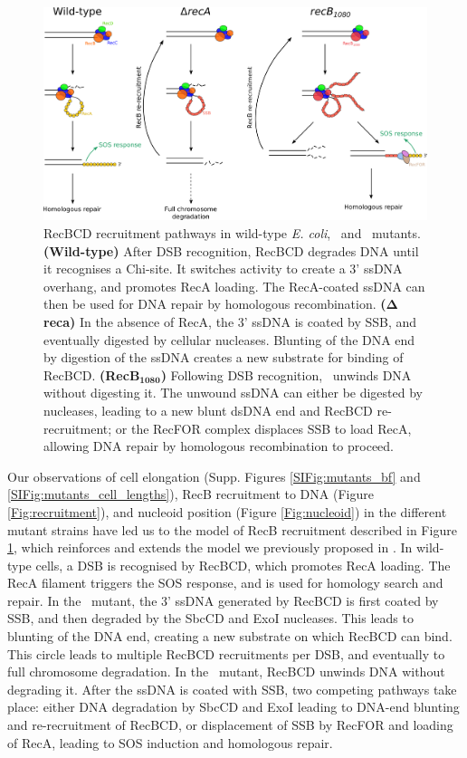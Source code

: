 \begin{figure}[htbp]
    \centering
    \includegraphics[width=\textwidth]{Figures/Fig_mutants_pathways.pdf}
    \caption{RecBCD recruitment pathways in wild-type \emph{E. coli}, \dreca\ and \geneteneighty\ mutants. \textbf{(Wild-type)} After DSB recognition, RecBCD degrades DNA until it recognises a Chi-site. It switches activity to create a 3' ssDNA overhang, and promotes RecA loading. The RecA-coated ssDNA can then be used for DNA repair by homologous recombination. \textbf{($\mathbf{\Delta}$reca)} In the absence of RecA, the 3' ssDNA is coated by SSB, and eventually digested by cellular nucleases. Blunting of the DNA end by digestion of the ssDNA creates a new substrate for binding of RecBCD. \textbf{(RecB$\mathbf{_{1080}}$)} Following DSB recognition, \teneighty\ unwinds DNA without digesting it. The unwound ssDNA can either be digested by nucleases, leading to a new blunt dsDNA end and RecBCD re-recruitment; or the RecFOR complex displaces SSB to load RecA, allowing DNA repair by homologous recombination to proceed.}
    \label{Fig:pathways}
\end{figure}

Our observations of cell elongation (Supp. Figures \ref{SIFig:mutants_bf} and \ref{SIFig:mutants_cell_lengths}), RecB recruitment to DNA (Figure \ref{Fig:recruitment}), and nucleoid position (Figure \ref{Fig:nucleoid}) in the different mutant strains have led us to the model of RecB recruitment described in Figure \ref{Fig:pathways}, which reinforces and extends the model we previously proposed in \cite{Lepore2023}. In wild-type cells, a DSB is recognised by RecBCD, which promotes RecA loading. The RecA filament triggers the SOS response, and is used for homology search and repair. In the \dreca\ mutant, the 3' ssDNA generated by RecBCD is first coated by SSB, and then degraded by the SbcCD and ExoI nucleases\cite{Zahradka2009}. This leads to blunting of the DNA end, creating a new substrate on which RecBCD can bind. This circle leads to multiple RecBCD recruitments per DSB, and eventually to full chromosome degradation. In the \geneteneighty\ mutant, RecBCD unwinds DNA without degrading it. After the ssDNA is coated with SSB, two competing pathways take place: either DNA degradation by SbcCD and ExoI leading to DNA-end blunting and re-recruitment of RecBCD, or displacement of SSB by RecFOR and loading of RecA, leading to SOS induction and homologous repair.

